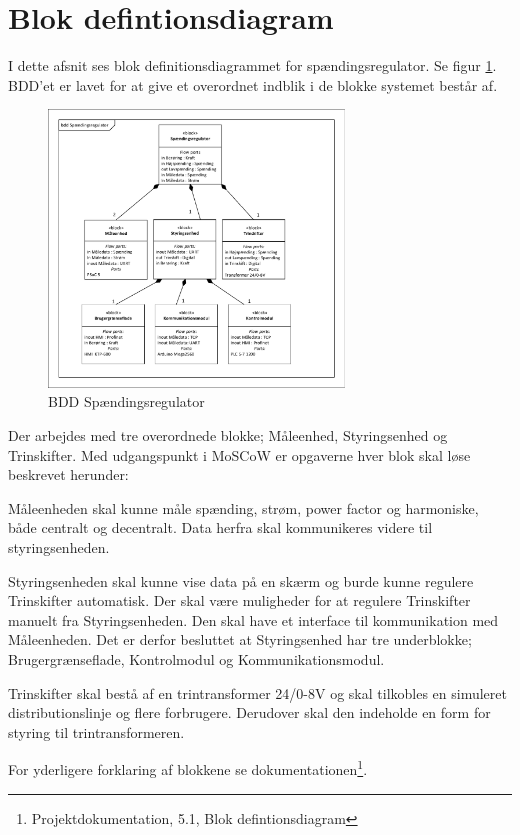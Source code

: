 
\section{Blok defintionsdiagram}

I dette afsnit ses blok definitionsdiagrammet for spændingsregulator. Se figur \ref{fig:BDDSpaendingsregulator}. BDD'et er lavet for at give et overordnet indblik i de blokke systemet består af.

\begin{figure}[H] %
	\centering
	\includegraphics[width=0.7\textwidth]{Figure/BDDSpaendingsregulator}
	\caption{BDD Spændingsregulator}
	\label{fig:BDDSpaendingsregulator}
\end{figure}

Der arbejdes med tre overordnede blokke; Måleenhed, Styringsenhed og Trinskifter. Med udgangspunkt i MoSCoW er opgaverne hver blok skal løse beskrevet herunder:


Måleenheden skal kunne måle spænding, strøm, power factor og harmoniske, både centralt og decentralt. Data herfra skal kommunikeres videre til styringsenheden. 


Styringsenheden skal kunne vise data på en skærm og burde kunne regulere Trinskifter automatisk. Der skal være muligheder for at regulere Trinskifter manuelt fra Styringsenheden. Den skal have et interface til kommunikation med Måleenheden. Det er derfor besluttet at Styringsenhed har tre underblokke; Brugergrænseflade, Kontrolmodul og Kommunikationsmodul.


Trinskifter skal bestå af en trintransformer 24/0-8V og skal tilkobles en simuleret distributionslinje og flere forbrugere. Derudover skal den indeholde en form for styring til trintransformeren.


For yderligere forklaring af blokkene se dokumentationen\footnote{Projektdokumentation, 5.1, Blok defintionsdiagram}.